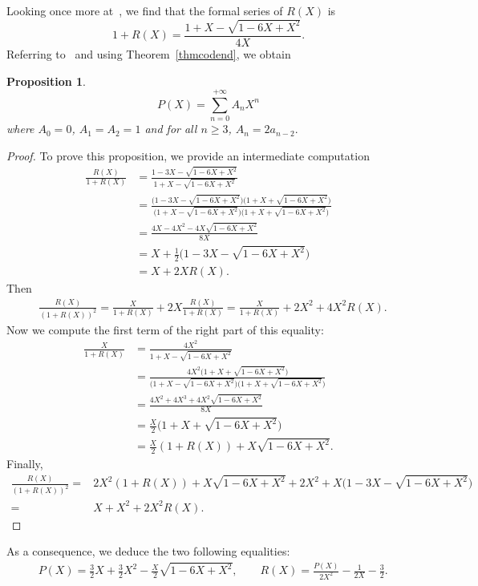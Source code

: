 \documentclass[pdftex]{sigma}
\numberwithin{equation}{section}
\theoremstyle{definition}
\theoremstyle{plain}
\newtheorem{Prop}[defi]{Proposition}
\begin{document}
Looking once more at~\cite{OEIS}, we find that the formal series of $R(X)$ is
\begin{equation*}
	1+R(X)=\frac{1+X-\sqrt{1-6X+X^2}}{4X}.
\end{equation*}
Referring to~\cite{OEIS} and using Theorem~\ref{thmcodend}, we obtain
\begin{Prop}\label{nbcodend}
	\[
	P(X)=\sum_{n=0}^{+\infty} A_nX^n
	\]
	where $A_0=0$, $A_1=A_2=1$ and for all $n\geq 3$, $A_n=2a_{n-2}.$
\end{Prop}
\begin{proof}
	To prove this proposition, we provide an intermediate computation
	\begin{align}
		\frac{R(X)}{1+R(X)}
		&=\frac{1-3X-\sqrt{1-6X+X^2}}{1+X-\sqrt{1-6X+X^2}} \nonumber \\
		&=\frac{\big(1-3X-\sqrt{1-6X+X^2}\big)\big(1+X+\sqrt{1-6X+X^2}\big)}{\big(1+X-\sqrt{1-6X+X^2}\big)\big(1+X+\sqrt{1-6X+X^2}\big)} \nonumber \\
		&=\frac{4X-4X^2-4X\sqrt{1-6X+X^2}}{8X} \nonumber \\
		&=X+\frac{1}{2}\big(1-3X-\sqrt{1-6X+X^2}\big) \nonumber \\
		&=X+2XR(X). \label{cal:PrimCoass}
	\end{align}
Then
 \begin{align*}
	&\frac{R(X)}{(1+R(X))^2}=\frac{X}{1+R(X)}+2X\frac{R(X)}{1+R(X)} =\frac{X}{1+R(X)}+2X^2+4X^2R(X).
\end{align*}
Now we compute the first term of the right part of this equality:
\begin{align*}
	\frac{X}{1+R(X)}&=\frac{4X^2}{1+X-\sqrt{1-6X+X^2}} \\
					&=\frac{4X^2\big(1+X+\sqrt{1-6X+X^2}\big)}{\big(1+X-\sqrt{1-6X+X^2}\big)\big(1+X+\sqrt{1-6X+X^2}\big)} \\
					&=\frac{4X^2+4X^3+4X^2\sqrt{1-6X+X^2}}{8X} \\
					&=\frac{X}{2}\big(1+X+\sqrt{1-6X+X^2}\big) \\
					&=\frac{X}{2}(1+R(X))+X\sqrt{1-6X+X^2}.
\end{align*}
Finally,
\begin{align*}
	\frac{R(X)}{(1+R(X))^2}
	={}&2X^2(1+R(X))+X\sqrt{1\!-\!6X\!+\!X^2}+2X^2+X\big(1-3X-\sqrt{1\!-\!6X\!+\!X^2}\big) \\
	={}& X+X^2+2X^2R(X). \tag*{\qed}
\end{align*}
\renewcommand{\qed}{}
\end{proof}

As a consequence, we deduce the two following equalities:
\begin{align*}
	&P(X)=\frac{3}{2}X+\frac{3}{2}X^2-\frac{X}{2}\sqrt{1-6X+X^2}, \qquad
	R(X)=\frac{P(X)}{2X^2}-\frac{1}{2X}-\frac{3}{2}.
\end{align*}
\end{document}
